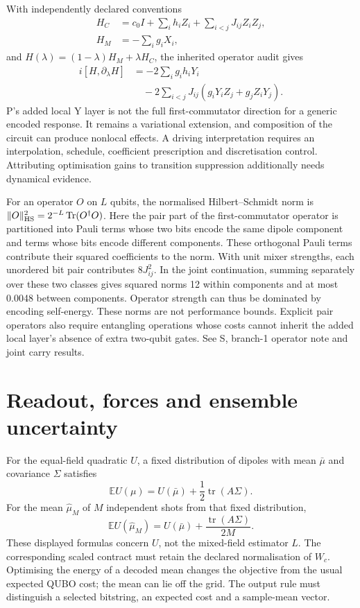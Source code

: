 \documentclass{article}
\begin{document}
With independently declared conventions
\begin{align}
H_C&=c_0I+\sum_i h_iZ_i+\sum_{i<j}J_{ij}Z_iZ_j,\\
H_M&=-\sum_i g_iX_i,
\end{align}
and $H(\lambda)=(1-\lambda)H_M+\lambda H_C$, the inherited operator audit gives
\begin{align}
i[H,\partial_\lambda H]&=-2\sum_i g_ih_iY_i\\
&\quad-2\sum_{i<j}J_{ij}(g_iY_iZ_j+g_jZ_iY_j).
\end{align}
P's added local Y layer is not the full first-commutator direction for a generic encoded response. It remains a variational extension, and composition of the circuit can produce nonlocal effects. A driving interpretation requires an interpolation, schedule, coefficient prescription and discretisation control. Attributing optimisation gains to transition suppression additionally needs dynamical evidence.

For an operator $O$ on $L$ qubits, the normalised Hilbert--Schmidt norm is $\|O\|_{\rm HS}^2=2^{-L}\operatorname{Tr}(O^\dagger O)$. Here the pair part of the first-commutator operator is partitioned into Pauli terms whose two bits encode the same dipole component and terms whose bits encode different components. These orthogonal Pauli terms contribute their squared coefficients to the norm. With unit mixer strengths, each unordered bit pair contributes $8J_{ij}^2$. In the joint continuation, summing separately over these two classes gives squared norms 12 within components and at most 0.0048 between components. Operator strength can thus be dominated by encoding self-energy. These norms are not performance bounds. Explicit pair operators also require entangling operations whose costs cannot inherit the added local layer's absence of extra two-qubit gates. See S, branch-1 operator note and joint carry results.

\section{Readout, forces and ensemble uncertainty}

For the equal-field quadratic $U$, a fixed distribution of dipoles with mean $\bar\mu$ and covariance $\Sigma$ satisfies
\begin{equation}
\mathbb E U(\mu)=U(\bar\mu)+\frac12\operatorname{tr}(A\Sigma).
\end{equation}
For the mean $\hat\mu_M$ of $M$ independent shots from that fixed distribution,
\begin{equation}
\mathbb E U(\hat\mu_M)=U(\bar\mu)+\frac{\operatorname{tr}(A\Sigma)}{2M}.
\end{equation}
These displayed formulas concern $U$, not the mixed-field estimator $L$. The corresponding scaled contract must retain the declared normalisation of $W_c$. Optimising the energy of a decoded mean changes the objective from the usual expected QUBO cost; the mean can lie off the grid. The output rule must distinguish a selected bitstring, an expected cost and a sample-mean vector.
\end{document}

